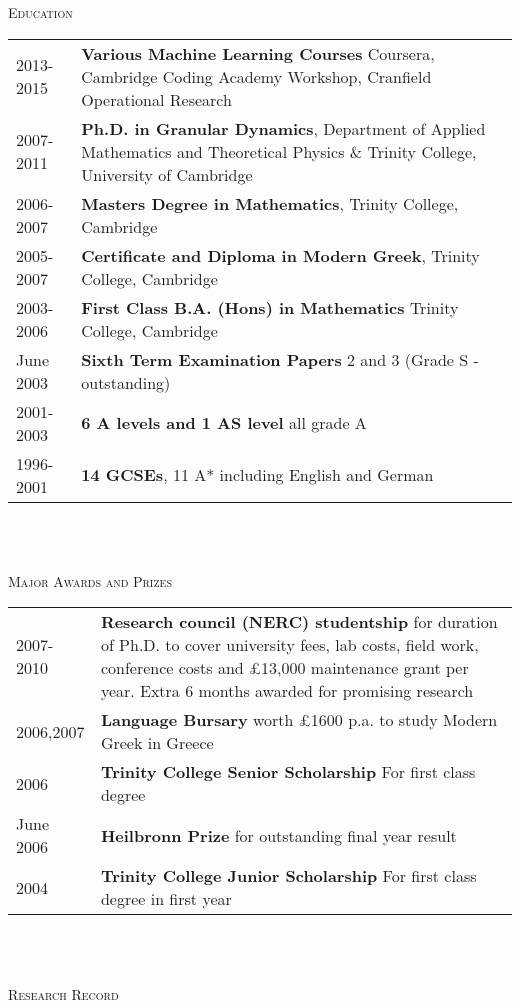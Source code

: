 \documentclass[a4paper,10pt]{article}
\newcommand{\lineunder}{\vspace*{0.2cm} \\ \hspace*{-20pt} \hrulefill \\ \vspace{-0.9cm}}
\newcommand{\header}[1]{{\hspace*{-17pt}\vspace*{6pt} \large{\textsc{#1}}}}
\begin{document}
\header{Education}

\begin{tabular}{p{0.8in}p{5.3in}}
2013-2015 & \textbf{Various Machine Learning Courses} Coursera, Cambridge Coding Academy Workshop, Cranfield Operational Research\\
2007-2011 & \textbf{Ph.D. in Granular Dynamics}, Department of Applied Mathematics and Theoretical Physics \& Trinity College, University of Cambridge \\
2006-2007 & \textbf{Masters Degree in Mathematics}, Trinity College, Cambridge \\ 
2005-2007 & \textbf{Certificate and Diploma in Modern Greek}, Trinity College, Cambridge \\
2003-2006 & \textbf{First Class B.A. (Hons) in Mathematics} Trinity College, Cambridge\\
June 2003 & \textbf{Sixth Term Examination Papers} 2 and 3 (Grade S - outstanding)  \\
2001-2003 & \textbf{6 A levels and 1 AS level} all grade A \\
1996-2001 & \textbf{14 GCSEs}, 11 A* including English and German \\
\end{tabular}
\newline
\lineunder

\header{Major Awards and Prizes}

\begin{tabular}{p{0.8in}p{5.3in}}
2007-2010 & \textbf{Research council (NERC) studentship} for duration of Ph.D. to cover university fees, lab costs, field work, conference costs and \pounds 13,000 maintenance grant per year. Extra 6 months awarded for promising research\\ 
2006,2007 & \textbf{Language Bursary} worth \pounds 1600 p.a. to study Modern Greek in Greece\\ 
2006 & \textbf{Trinity College Senior Scholarship} For first class degree\\
June 2006 & \textbf{Heilbronn Prize} for outstanding final year result\\
2004 & \textbf{Trinity College Junior Scholarship} For first class degree in first year\\
\end{tabular}
\newline
\lineunder

\header{Research Record}
\end{document}
